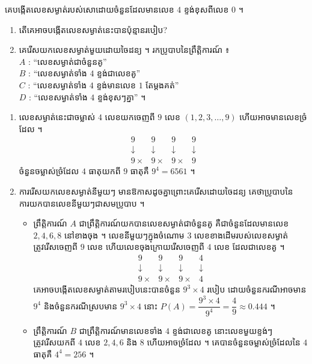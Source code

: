 \begin{example}[លំហាត់គំរូ ២]
គេបង្កើតលេខសម្ងាត់របស់សោដោយចំនួនដែលមានលេខ $4$ ខ្ទង់ខុសពីលេខ $0$ ។
\begin{enumerate}[a]
  \item តើគេអាចបង្កើតលេខសម្ងាត់នេះបានប៉ុន្មានរបៀប?
  \item គេរើសយកលេខសម្ងាត់មួយដោយចៃដន្យ ។ រកប្រូបាបនៃព្រឹត្តិការណ៍ ៖\\
  $A$ : “លេខសម្ងាត់ជាចំនួនគូ”\\
  $B$ : “លេខសម្ងាត់ទាំង $4$ ខ្ទង់ជាលេខគូ”\\
  $C$ : “លេខសម្ងាត់ទាំង $4$ ខ្ទង់មានលេខ $1$ តែម្ដងគត់”\\
  $D$ : “លេខសម្ងាត់ទាំង $4$ ខ្ទង់ខុសៗគ្នា” ។
\end{enumerate}
\ans
\begin{enumerate}[a]
  \item លេខសម្ងាត់នេះជាចម្លាស់ $4$ លេខយកចេញពី $9$ លេខ $(1, 2, 3, \dots, 9)$ ហើយអាចមានលេខច្រំដែល ។
  \[
  \begin{array}{cccc}
  \boxed{9} & \boxed{9} & \boxed{9} & \boxed{9}\\
  \downarrow & \downarrow & \downarrow & \downarrow\\
  9 \times & 9 \times & 9 \times & 9
  \end{array}
  \]
  ចំនួនចម្លាស់ច្រំដែល $4$ ធាតុយកពី $9$ ធាតុគឺ $9^4 = 6561$ ។
  \item ការរើសយកលេខសម្ងាត់នីមួយៗ មានឱកាសដូចគ្នាព្រោះគេរើសដោយចៃដន្យ គេថាប្រូបាបនៃការយកបានលេខនីមួយៗជាសមប្រូបាប ។
  \begin{itemize}
    \item ព្រឹត្តិការណ៍ $A$ ជាព្រឹត្តិការណ៍យកបានលេខសម្ងាត់ជាចំនួនគូ គឺជាចំនួនដែលមានលេខ $2, 4, 6, 8$ នៅខាងចុង ។ លេខនីមួយៗក្នុងចំណោម $3$ លេខខាងដើមរបស់លេខសម្ងាត់ត្រូវរើសចេញពី $9$ លេខ ហើយលេខចុងក្រោយរើសចេញពី $4$ លេខ ដែលជាលេខគូ ។
    \[
    \begin{array}{cccc}
    \boxed{9} & \boxed{9} & \boxed{9} & \boxed{4}\\
    \downarrow & \downarrow & \downarrow & \downarrow\\
    9 \times & 9 \times & 9 \times & 4
    \end{array}
    \]
    គេអាចបង្កើតលេខសម្ងាត់តាមរបៀបនេះបានចំនួន $9^3\times 4$ របៀប ដោយចំនួនករណីអាចមាន $9^4$ និងចំនួនករណីស្របមាន $9^3\times 4$ នោះ $P(A) = \dfrac{9^3\times 4}{9^4} = \dfrac{4}{9} \approx 0.444$ ។
    \item ព្រឹត្តិការណ៍ $B$ ជាព្រឹត្តិការណ៍មានលេខទាំង $4$ ខ្ទង់ជាលេខគូ នោះលេខមួយខ្ទង់ៗត្រូវរើសយកពី $4$ លេខ $2, 4, 6$ និង $8$ ហើយអាចច្រំដែល ។ គេបានចំនួនចម្លាស់ច្រំដែលនៃ $4$ ធាតុគឺ $4^4 = 256$ ។

\end{itemize}
\end{enumerate}
\end{example}

